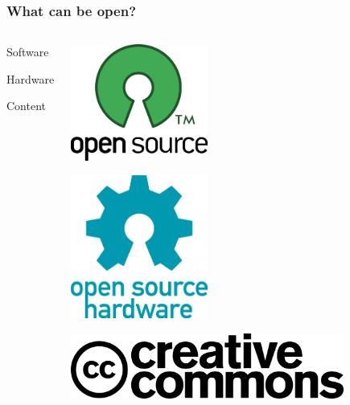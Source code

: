 \documentclass{beamer}
\begin{document}
\begin{frame}
  \frametitle{What can be open?}
  \begin{columns}
    \begin{center}
      \begin{LARGE}Software\end{LARGE}
      
      \vspace{5em}

      \begin{LARGE}Hardware\end{LARGE}

      \vspace{5em}

      \begin{LARGE}Content\end{LARGE}
    \end{center}
    \begin{center}
      \includegraphics[width=0.4\textwidth]{img/opensource}

      \vspace{1em}

      \includegraphics[width=0.4\textwidth]{img/opensourcehardware.png}

      \vspace{1em}

      \includegraphics[width=0.8\textwidth]{img/cc.png}
    \end{center}
  \end{columns}

\end{frame}
\end{document}
